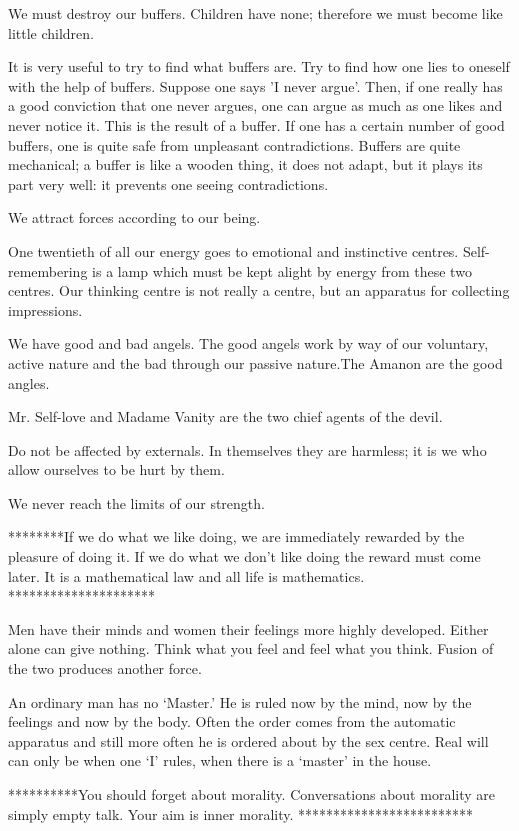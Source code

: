 \documentclass[12pt,letterpaper]{book}
\begin{document}
We must destroy our buffers. Children have none; therefore we must become like little children.

It is very useful to try to find what buffers are. Try to find how one lies to oneself
with the help of buffers. Suppose one says 'I never argue'. Then, if one really has a
good conviction that one never argues, one can argue as much as one likes and never
notice it. This is the result of a buffer. If one has a certain number of good buffers, one
is quite safe from unpleasant contradictions. Buffers are quite mechanical; a buffer is
like a wooden thing, it does not adapt, but it plays its part very well: it prevents one
seeing contradictions.

We attract forces according to our being.

One twentieth of all our energy goes to emotional and instinctive centres. Self-remembering is a lamp which must be kept alight by energy from these two centres. Our thinking centre is not really a centre, but an apparatus for collecting impressions.

We have good and bad angels. The good angels work by way of our voluntary, active nature and the bad through our passive nature.The Amanon are the good angles.

Mr. Self-love and Madame Vanity are the two chief agents of the devil.

Do not be affected by externals. In themselves they are harmless; it is we who allow ourselves to be hurt by them.

We never reach the limits of our strength.

********If we do what we like doing, we are immediately rewarded by the pleasure of doing it. If we do what we don’t like doing the reward must come later. It is a mathematical law and all life is mathematics. *********************

Men have their minds and women their feelings more highly developed. Either alone can give nothing. Think what you feel and feel what you think. Fusion of the two produces another force.

An ordinary man has no ‘Master.’ He is ruled now by the mind, now by the feelings and now by the body. Often the order comes from the automatic apparatus and still more often he is ordered about by the sex centre. Real will can only be when one ‘I’ rules, when there is a ‘master’ in the house.

**********You should forget about morality. Conversations about morality are simply empty talk. Your aim is inner morality. *************************
\end{document}
